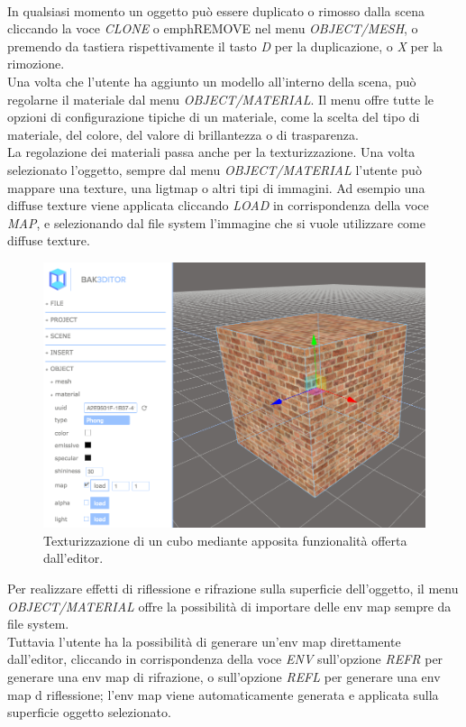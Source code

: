 \\
In qualsiasi momento un oggetto può essere duplicato o rimosso dalla scena cliccando la voce \emph{CLONE} o emph{REMOVE} nel menu \emph{OBJECT/MESH}, o premendo da tastiera rispettivamente il tasto \emph{D} per la duplicazione, o \emph{X} per la rimozione.
\\
Una volta che l’utente ha aggiunto un modello all’interno della scena, può regolarne il materiale dal menu \emph{OBJECT/MATERIAL}. Il menu offre tutte le opzioni di configurazione tipiche di un materiale, come la scelta del tipo di materiale, del colore, del valore di brillantezza o di trasparenza.
\\
La regolazione dei materiali passa anche per la texturizzazione. 
Una volta selezionato l’oggetto, sempre dal menu \emph{OBJECT/MATERIAL} l’utente può mappare una texture, una ligtmap o altri tipi di immagini. Ad esempio una diffuse texture viene applicata cliccando \emph{LOAD} in corrispondenza della voce \emph{MAP}, e selezionando dal file system l’immagine che si vuole utilizzare come diffuse texture. 
\newpage
\begin{figure}[htb]
 \centering
 \includegraphics[width=0.7\linewidth]{images/chapter_caso_uso/caso_uso_texture.png}\hfill
 \caption[Texturizzazione]{Texturizzazione di un cubo mediante apposita funzionalità offerta dall'editor.}
 \label{fig:caso_uso_texture}
\end{figure}
Per realizzare effetti di riflessione e rifrazione sulla superficie dell’oggetto, il menu \emph{OBJECT/MATERIAL} offre la possibilità di importare delle env map sempre da file system. 
\\
Tuttavia l’utente ha la possibilità di generare un’env map direttamente dall’editor, cliccando in corrispondenza della voce \emph{ENV} sull’opzione \emph{REFR} per generare una env map di rifrazione, o sull’opzione \emph{REFL} per generare una env map d riflessione; l’env map viene automaticamente generata e applicata sulla superficie oggetto selezionato.
